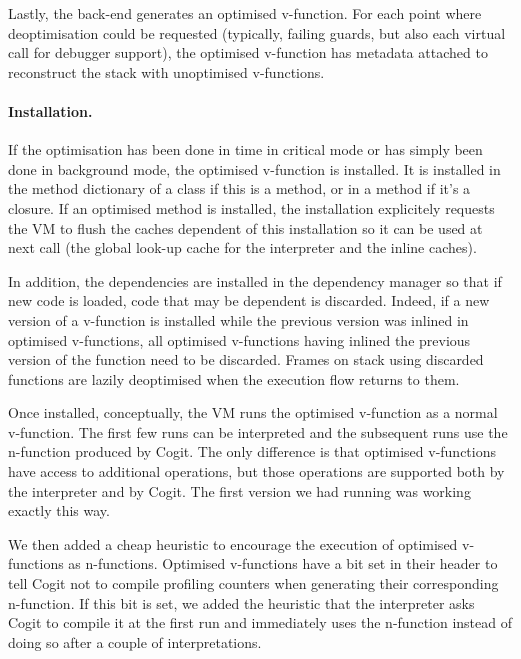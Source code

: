 \documentclass[a4paper,12pt,twoside]{../includes/ThesisStyle}
\begin{document}
Lastly, the back-end generates an optimised v-function. For each point where deoptimisation could be requested (typically, failing guards, but also each virtual call for debugger support), the optimised v-function has metadata attached to reconstruct the stack with unoptimised v-functions.

\paragraph{Installation.}

If the optimisation has been done in time in critical mode or has simply been done in background mode, the optimised v-function is installed. It is installed in the method dictionary of a class if this is a method, or in a method if it's a closure. If an optimised method is installed, the installation explicitely requests the VM to flush the caches dependent of this installation so it can be used at next call (the global look-up cache for the interpreter and the inline caches).

In addition, the dependencies are installed in the dependency manager so that if new code is loaded, code that may be dependent is discarded. Indeed, if a new version of a v-function is installed while the previous version was inlined in optimised v-functions, all optimised v-functions having inlined the previous version of the function need to be discarded. Frames on stack using discarded functions are lazily deoptimised when the execution flow returns to them.

Once installed, conceptually, the VM runs the optimised v-function as a normal v-function. The first few runs can be interpreted and the subsequent runs use the n-function produced by Cogit. The only difference is that optimised v-functions have access to additional operations, but those operations are supported both by the interpreter and by Cogit. The first version we had running was working exactly this way.

We then added a cheap heuristic to encourage the execution of optimised v-functions as n-functions. Optimised v-functions have a bit set in their header to tell Cogit not to compile profiling counters when generating their corresponding n-function. If this bit is set, we added the heuristic that the interpreter asks Cogit to compile it at the first run and immediately uses the n-function instead of doing so after a couple of interpretations.
\end{document}
